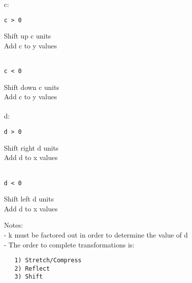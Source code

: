 \documentclass{article}
\begin{document}
\begin{multicols}{2}
\noindent
c:

\begin{verbatim}
c > 0
\end{verbatim}

\noindent
Shift up c units\\
Add c to y values\\\\

\begin{verbatim}
c < 0
\end{verbatim}

\noindent
Shift down c units\\
Add c to y values\\\\

\columnbreak
\noindent
d:

\begin{verbatim}
d > 0
\end{verbatim}

\noindent
Shift right d units\\
Add d to x values\\\\

\begin{verbatim}
d < 0
\end{verbatim}

\noindent
Shift left d units\\
Add d to x values \\

\end{multicols}

\noindent
Notes:\\
- k must be factored out in order to determine the value of d\\
- The order to complete transformations is:
\begin{verbatim}
   1) Stretch/Compress
   2) Reflect
   3) Shift
\end{verbatim}
\end{document}
